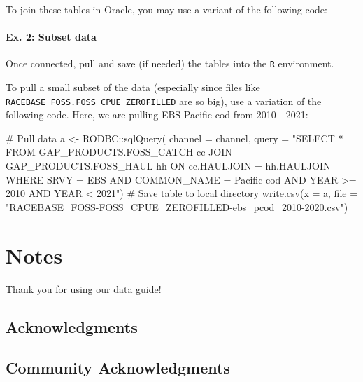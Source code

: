 \documentclass[
  letterpaper,
  oneside,
  open=any]{scrbook}
\newenvironment{Shaded}{\begin{snugshade}}{\end{snugshade}}
\newcommand{\AttributeTok}[1]{\textcolor[rgb]{0.40,0.45,0.13}{#1}}
\newcommand{\CommentTok}[1]{\textcolor[rgb]{0.37,0.37,0.37}{#1}}
\newcommand{\FunctionTok}[1]{\textcolor[rgb]{0.28,0.35,0.67}{#1}}
\newcommand{\NormalTok}[1]{\textcolor[rgb]{0.00,0.23,0.31}{#1}}
\newcommand{\OtherTok}[1]{\textcolor[rgb]{0.00,0.23,0.31}{#1}}
\newcommand{\SpecialCharTok}[1]{\textcolor[rgb]{0.37,0.37,0.37}{#1}}
\newcommand{\StringTok}[1]{\textcolor[rgb]{0.13,0.47,0.30}{#1}}
\begin{document}
To join these tables in Oracle, you may use a variant of the following
code:

\hypertarget{ex.-2-subset-data}{%
\subsection{Ex. 2: Subset data}\label{ex.-2-subset-data}}

Once connected, pull and save (if needed) the tables into the \texttt{R}
environment.

To pull a small subset of the data (especially since files like
\texttt{RACEBASE\_FOSS.FOSS\_CPUE\_ZEROFILLED} are so big), use a
variation of the following code. Here, we are pulling EBS Pacific cod
from 2010 - 2021:

\begin{Shaded}
\begin{Highlighting}[]
\CommentTok{\# Pull data}
\NormalTok{a }\OtherTok{\textless{}{-}}\NormalTok{ RODBC}\SpecialCharTok{::}\FunctionTok{sqlQuery}\NormalTok{(}
\AttributeTok{channel =}\NormalTok{ channel, }
\AttributeTok{query =} 
\StringTok{"SELECT * FROM GAP\_PRODUCTS.FOSS\_CATCH cc}
\StringTok{JOIN GAP\_PRODUCTS.FOSS\_HAUL hh}
\StringTok{ON cc.HAULJOIN = hh.HAULJOIN}
\StringTok{WHERE SRVY = \textquotesingle{}EBS\textquotesingle{} }
\StringTok{AND COMMON\_NAME = \textquotesingle{}Pacific cod\textquotesingle{} }
\StringTok{AND YEAR \textgreater{}= 2010 }
\StringTok{AND YEAR \textless{} 2021"}\NormalTok{)}
\CommentTok{\# Save table to local directory}
\FunctionTok{write.csv}\NormalTok{(}\AttributeTok{x =}\NormalTok{ a, }\AttributeTok{file =} \StringTok{"RACEBASE\_FOSS{-}FOSS\_CPUE\_ZEROFILLED{-}ebs\_pcod\_2010{-}2020.csv"}\NormalTok{)}
\end{Highlighting}
\end{Shaded}

\part{Notes}

Thank you for using our data guide!

\hypertarget{acknowledgments}{%
\chapter{Acknowledgments}\label{acknowledgments}}

\hypertarget{community-acknowledgments}{%
\chapter{Community Acknowledgments}\label{community-acknowledgments}}
\end{document}

